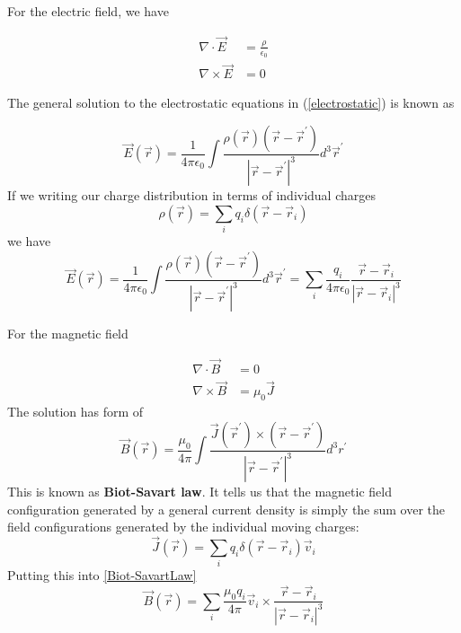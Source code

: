 For the electric field, we have
\begin{qt}
\begin{equation}
\begin{aligned}
\nabla \cdot \vec{E} &=\frac{\rho}{\epsilon_{0}} \\
\nabla \times \vec{E} &=0
\end{aligned}
\label{electrostatic}
\end{equation}
\end{qt}
The general solution to the electrostatic equations in (\ref{electrostatic}) is known as 
\begin{qt}
\begin{equation}
\vec{E}(\vec{r})=\frac{1}{4 \pi \epsilon_{0}} \int \frac{\rho(\vec{r})\left(\vec{r}-\vec{r}^{\prime}\right)}{\left|\vec{r}-\vec{r}^{\prime}\right|^{3}} d^{3} \vec{r}^{\prime}
\label{coulombLaw}
\end{equation}
If we writing our charge distribution in terms of individual charges
$$
\rho(\vec{r})=\sum_{i} q_{i} \delta\left(\vec{r}-\vec{r}_{i}\right)
$$
we have
$$
\vec{E}(\vec{r})=\frac{1}{4 \pi \epsilon_{0}} \int \frac{\rho(\vec{r})\left(\vec{r}-\vec{r}^{\prime}\right)}{\left|\vec{r}-\vec{r}^{\prime}\right|^{3}} d^{3} \vec{r}^{\prime}=\sum_{i} \frac{q_{i}}{4 \pi \epsilon_{0}} \frac{\vec{r}-\vec{r}_{i}}{\left|\vec{r}-\vec{r}_{i}\right|^{3}}
$$
\end{qt}
For the magnetic field
\begin{qt}
\begin{equation}
\begin{aligned}
\nabla \cdot \vec{B} &=0 \\
\nabla \times \vec{B} &=\mu_{0} \vec{J}
\end{aligned}
\end{equation}
The solution has form of
\begin{equation}
\vec{B}(\vec{r})=\frac{\mu_{0}}{4 \pi} \int \frac{\vec{J}\left(\vec{r}^{\prime}\right) \times\left(\vec{r}-\vec{r}^{\prime}\right)}{\left|\vec{r}-\vec{r}^{\prime}\right|^{3}} d^{3} r^{\prime}
\label{Biot-SavartLaw}
\end{equation}
This is known as \textbf{Biot-Savart law}. It tells us that the magnetic field configuration generated by a general current density is simply the sum over the field configurations generated by the individual moving charges:
$$
\vec{J}(\vec{r})=\sum_{i} q_{i} \delta\left(\vec{r}-\vec{r}_{i}\right) \vec{v}_{i}
$$
Putting this into \ref{Biot-SavartLaw}
$$
\vec{B}(\vec{r})=\sum_{i} \frac{\mu_{0} q_{i}}{4 \pi} \vec{v}_{i} \times \frac{\vec{r}-\vec{r}_{i}}{\left|\vec{r}-\vec{r}_{i}\right|^{3}}
$$
\end{qt}
